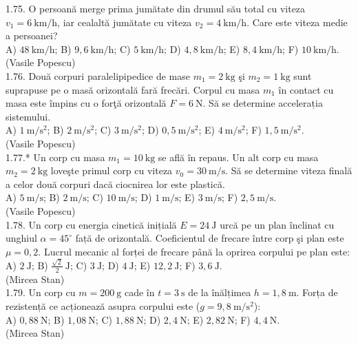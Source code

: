 1.75. O persoană merge prima jumătate din drumul său total cu viteza $v_{1}=6 \mathrm{~km} / \mathrm{h}$, iar cealaltă jumătate cu viteza $v_{2}=4 \mathrm{~km} / \mathrm{h}$. Care este viteza medie a persoanei?\\ A) $48 \mathrm{~km} / \mathrm{h}$; B) $9,6 \mathrm{~km} / \mathrm{h}$; C) $5 \mathrm{~km} / \mathrm{h}$; D) $4,8 \mathrm{~km} / \mathrm{h}$; E) $8,4 \mathrm{~km} / \mathrm{h}$; F) $10 \mathrm{~km} / \mathrm{h}$.\\ (Vasile Popescu)\\

1.76. Două corpuri paralelipipedice de mase $m_{1}=2 \mathrm{~kg}$ şi $m_{2}=1 \mathrm{~kg}$ sunt suprapuse pe o masă orizontală fară frecări. Corpul cu masa $m_{1}$ în contact cu masa este împins cu o forţă orizontală $F=6 \mathrm{~N}$. Să se determine accelerația sistemului.\\ A) $1 \mathrm{~m} / \mathrm{s}^{2}$; B) $2 \mathrm{~m} / \mathrm{s}^{2}$; C) $3 \mathrm{~m} / \mathrm{s}^{2}$; D) $0,5 \mathrm{~m} / \mathrm{s}^{2}$; E) $4 \mathrm{~m} / \mathrm{s}^{2}$; F) $1,5 \mathrm{~m} / \mathrm{s}^{2}$.\\ (Vasile Popescu)\\

1.77.* Un corp cu masa $m_{1}=10 \mathrm{~kg}$ se află în repaus. Un alt corp cu masa $m_{2}=2 \mathrm{~kg}$ loveşte primul corp cu viteza $v_{0}=30 \mathrm{~m} / \mathrm{s}$. Să se determine viteza finală a celor două corpuri dacă ciocnirea lor este plastică.\\ A) $5 \mathrm{~m} / \mathrm{s}$; B) $2 \mathrm{~m} / \mathrm{s}$; C) $10 \mathrm{~m} / \mathrm{s}$; D) $1 \mathrm{~m} / \mathrm{s}$; E) $3 \mathrm{~m} / \mathrm{s}$; F) $2,5 \mathrm{~m} / \mathrm{s}$.\\ (Vasile Popescu)\\

1.78. Un corp cu energia cinetică inițială $E=24 \mathrm{~J}$ urcă pe un plan înclinat cu unghiul $\alpha=45^{\circ}$ față de orizontală. Coeficientul de frecare între corp şi plan este $\mu=0,2$. Lucrul mecanic al forței de frecare până la oprirea corpului pe plan este:\\ A) $2 \mathrm{~J}$; B) $\frac{\sqrt{2}}{2} \mathrm{~J}$; C) $3 \mathrm{~J}$; D) $4 \mathrm{~J}$; E) $12,2 \mathrm{~J}$; F) $3,6 \mathrm{~J}$.\\ (Mircea Stan)\\

1.79. Un corp cu $m=200 \mathrm{~g}$ cade în $t=3 \mathrm{~s}$ de la înălțimea $h=1,8 \mathrm{~m}$. Forța de rezistență ce acționează asupra corpului este ($g=9,8 \mathrm{~m} / \mathrm{s}^{2}$):\\ A) $0,88 \mathrm{~N}$; B) $1,08 \mathrm{~N}$; C) $1,88 \mathrm{~N}$; D) $2,4 \mathrm{~N}$; E) $2,82 \mathrm{~N}$; F) $4,4 \mathrm{~N}$.\\ (Mircea Stan)\\

